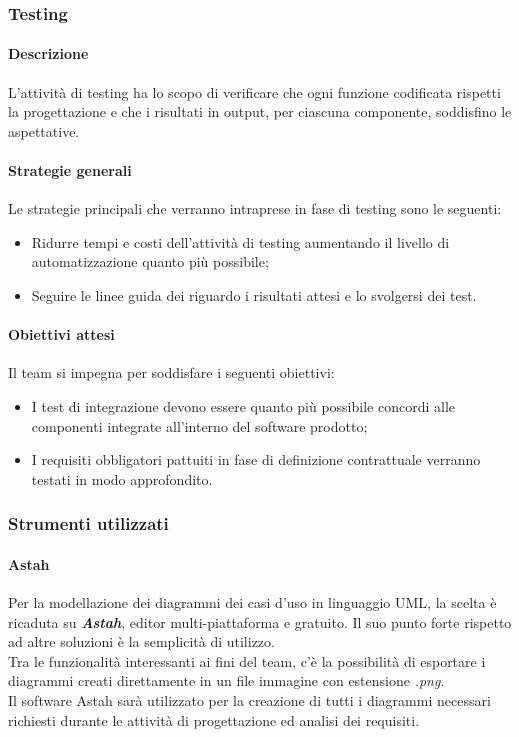 	\subsubsection{Testing}
	\paragraph{Descrizione}
	L'attività di testing ha lo scopo di verificare che ogni funzione codificata rispetti la progettazione e che i risultati in output, per ciascuna componente, soddisfino le aspettative.
	
	\paragraph{Strategie generali}
	Le strategie principali che verranno intraprese in fase di testing sono le seguenti:
	
	\begin{itemize}
		\item Ridurre tempi e costi dell'attività di testing aumentando il livello di automatizzazione quanto più possibile;
		\item Seguire le linee guida dei \textit{\Progs} riguardo i risultati attesi e lo svolgersi dei test.
	\end{itemize}
	
	\paragraph{Obiettivi attesi}
	Il team si impegna per soddisfare i seguenti obiettivi:
	
	\begin{itemize}
		\item I test di integrazione devono essere quanto più possibile concordi alle componenti integrate all'interno del software prodotto;
		\item I requisiti obbligatori pattuiti in fase di definizione contrattuale verranno testati in modo approfondito.
	\end{itemize}

	\subsubsection{Strumenti utilizzati}
	
		\paragraph{Astah}
		Per la modellazione dei diagrammi dei casi d'uso in linguaggio UML, la scelta è ricaduta su \textit{\textbf{Astah}}, editor multi-piattaforma e gratuito. Il suo punto forte rispetto ad altre soluzioni è la semplicità di utilizzo.\\
		Tra le funzionalità interessanti ai fini del team, c'è la possibilità di esportare i diagrammi creati direttamente in un file immagine con estensione \textit{.png}.\\
		Il software Astah sarà utilizzato per la creazione di tutti i diagrammi necessari richiesti durante le attività di progettazione ed analisi dei requisiti.
		
